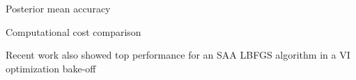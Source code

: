 \documentclass[8pt]{beamer}\usepackage[]{graphicx}\usepackage[]{color}
\begin{document}









\begin{frame}{Posterior mean accuracy}
    \PosteriorMeanAccuracy{}
\end{frame}




\begin{frame}{Computational cost comparison}

\begin{minipage}{0.9\textwidth}
\RuntimeCombined{}
\end{minipage}

Recent work also showed top performance for an SAA LBFGS
algorithm in a VI optimization bake-off
\citep{campbell:2026:LargescaleEmpiricalTuning2026}
\end{frame}

\end{document}
